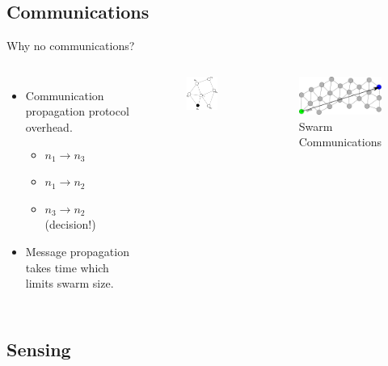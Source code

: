 \documentclass{beamer}
\begin{document}
\subsection{Communications}
\begin{frame}{Why no communications?}
  
  \begin{columns}
      \begin{itemize}
        \item {
          Communication propagation protocol overhead.
          \begin{itemize}
            \item $n_1 \rightarrow n_3$
            \item $n_1 \rightarrow n_2$
            \item $n_3 \rightarrow n_2$ (decision!) 
          \end{itemize}
        }
        \item {   
          Message propagation takes time which limits swarm size.
        }
      \end{itemize}
      \begin{figure}
        \begin{center}
          \includegraphics[width=2.5cm]{MessagePropogation1.pdf}
        \end{center}
      \end{figure}
      \begin{figure}
        \begin{center}
          \includegraphics[width=4cm]{Comms1.pdf}
        \end{center}
        \caption{Swarm Communications}
      \end{figure}
    \end{columns}
\end{frame}

\subsection{Sensing}
\end{document}
